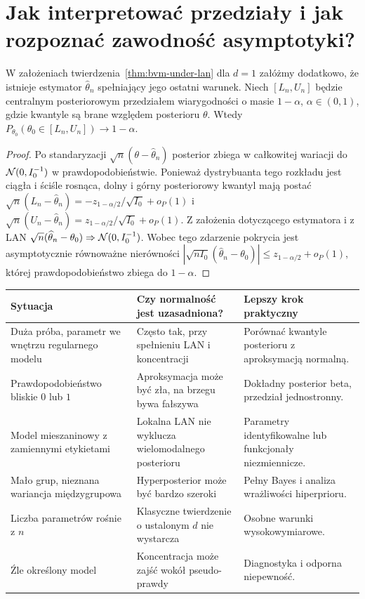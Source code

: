 \section{Jak interpretować przedziały i jak rozpoznać zawodność asymptotyki?}
\begin{stwierdzenie}
\label{prop:credible-frequentist-coverage}
W założeniach twierdzenia~\ref{thm:bvm-under-lan} dla $d=1$
załóżmy dodatkowo, że istnieje estymator
$\widehat\theta_n$ spełniający jego ostatni warunek.
Niech $[L_n,U_n]$ będzie centralnym posteriorowym
przedziałem wiarygodności o masie $1-\alpha$,
$\alpha\in(0,1)$, gdzie kwantyle są brane względem
posterioru $\theta$.
Wtedy $P_{\theta_0}(\theta_0\in[L_n,U_n])\to1-\alpha$.
\end{stwierdzenie}
\begin{proof}
Po standaryzacji $\sqrt n(\theta-\widehat\theta_n)$
posterior zbiega w całkowitej wariacji do
$\mathcal N(0,I_0^{-1})$ w prawdopodobieństwie.
Ponieważ dystrybuanta tego rozkładu jest ciągła i ściśle
rosnąca, dolny i górny posteriorowy kwantyl mają postać
$\sqrt n(L_n-\widehat\theta_n)
 =-z_{1-\alpha/2}/\sqrt{I_0}+o_P(1)$ i
$\sqrt n(U_n-\widehat\theta_n)
 = z_{1-\alpha/2}/\sqrt{I_0}+o_P(1)$.
Z założenia dotyczącego estymatora i z LAN
$\sqrt n(\widehat\theta_n-\theta_0)
 \Rightarrow\mathcal N(0,I_0^{-1})$.
Wobec tego zdarzenie pokrycia jest asymptotycznie
równoważne nierówności
$|\sqrt{nI_0}(\widehat\theta_n-\theta_0)|
 \le z_{1-\alpha/2}+o_P(1)$, której prawdopodobieństwo
zbiega do $1-\alpha$.
\end{proof}

\begin{center}\small
\begin{tabular}{>{\raggedright\arraybackslash}p{}>{\raggedright\arraybackslash}p{}>{\raggedright\arraybackslash}p{}}
\toprule
\textbf{Sytuacja} & \textbf{Czy normalność jest uzasadniona?} & \textbf{Lepszy krok praktyczny}\\
\midrule
Duża próba, parametr we wnętrzu regularnego modelu & Często tak, przy spełnieniu LAN i koncentracji & Porównać kwantyle posterioru z aproksymacją normalną.\\
Prawdopodobieństwo bliskie $0$ lub $1$ & Aproksymacja może być zła, na brzegu bywa fałszywa & Dokładny posterior beta, przedział jednostronny.\\
Model mieszaninowy z zamiennymi etykietami & Lokalna LAN nie wyklucza wielomodalnego posterioru & Parametry identyfikowalne lub funkcjonały niezmiennicze.\\
Mało grup, nieznana wariancja międzygrupowa & Hyperposterior może być bardzo szeroki & Pełny Bayes i analiza wrażliwości hiperprioru.\\
Liczba parametrów rośnie z $n$ & Klasyczne twierdzenie o ustalonym $d$ nie wystarcza & Osobne warunki wysokowymiarowe.\\
Źle określony model & Koncentracja może zajść wokół pseudo-prawdy & Diagnostyka i odporna niepewność.\\
\bottomrule
\end{tabular}
\end{center}

